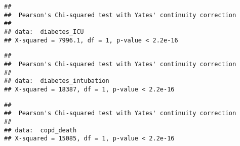 \documentclass[
]{article}
\newenvironment{Shaded}{\begin{snugshade}}{\end{snugshade}}
\newcommand{\CommentTok}[1]{\textcolor[rgb]{0.56,0.35,0.01}{\textit{#1}}}
\newcommand{\FunctionTok}[1]{\textcolor[rgb]{0.00,0.00,0.00}{#1}}
\newcommand{\NormalTok}[1]{#1}
\newcommand{\OtherTok}[1]{\textcolor[rgb]{0.56,0.35,0.01}{#1}}
\newcommand{\SpecialCharTok}[1]{\textcolor[rgb]{0.00,0.00,0.00}{#1}}
\begin{document}
\begin{Shaded}
\end{Shaded}

\begin{verbatim}
## 
##  Pearson's Chi-squared test with Yates' continuity correction
## 
## data:  diabetes_ICU
## X-squared = 7996.1, df = 1, p-value < 2.2e-16
\end{verbatim}

\begin{Shaded}
\end{Shaded}

\begin{verbatim}
## 
##  Pearson's Chi-squared test with Yates' continuity correction
## 
## data:  diabetes_intubation
## X-squared = 18387, df = 1, p-value < 2.2e-16
\end{verbatim}

\begin{Shaded}
\end{Shaded}

\begin{verbatim}
## 
##  Pearson's Chi-squared test with Yates' continuity correction
## 
## data:  copd_death
## X-squared = 15085, df = 1, p-value < 2.2e-16
\end{verbatim}
\end{document}
